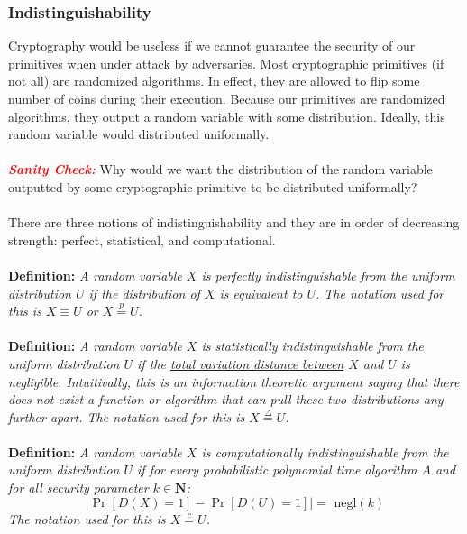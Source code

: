 \documentclass{article}
\newcommand{\N}{{\mathbf N}}
\newcommand{\ci}{\stackrel{c}{=}}
\newcommand{\si}{\stackrel{\Delta}{=}}
\begin{document}
\subsubsection{Indistinguishability}
Cryptography would be useless if we cannot guarantee the security of our primitives when under attack by adversaries. Most cryptographic primitives (if not all) are randomized algorithms. In effect, they are allowed to flip some number of coins during their execution. Because our primitives are randomized algorithms, they output a random variable with some distribution. Ideally, this random variable would distributed uniformally. \\ \\
\noindent \textbf{\textit{\textcolor{red}{Sanity Check:}}} Why would we want the distribution of the random variable outputted by some cryptographic primitive to be distributed uniformally? \\ \\
\noindent There are three notions of indistinguishability and they are in order of decreasing strength: perfect, statistical, and computational. \\ \\
\noindent \textbf{Definition:} \textit{A random variable $X$ is perfectly indistinguishable from the uniform distribution $U$ if the distribution of $X$ is equivalent to $U$. The notation used for this is $X \equiv U$ or $X \stackrel{p}{=} U$.} \\ \\
\noindent \textbf{Definition:} \textit{A random variable $X$ is statistically indistinguishable from the uniform distribution $U$ if the \href{https://en.wikipedia.org/wiki/Total_variation_distance_of_probability_measures}{total variation distance between} $X$ and $U$ is negligible. Intuitivally, this is an information theoretic argument saying that there does not exist a function or algorithm that can pull these two distributions any further apart. The notation used for this is $X \si U$.} \\ \\
\noindent \textbf{Definition:} \textit{A random variable $X$ is computationally indistinguishable from the uniform distribution $U$ if for every probabilistic polynomial time algorithm $A$ and for all security parameter $k \in \N$:}
$$\bigg\lvert \Pr[D(X) = 1] - \Pr[D(U) = 1]\bigg\rvert = \text{ negl}(k)$$
\textit{The notation used for this is $X \ci U$.}
\end{document}
